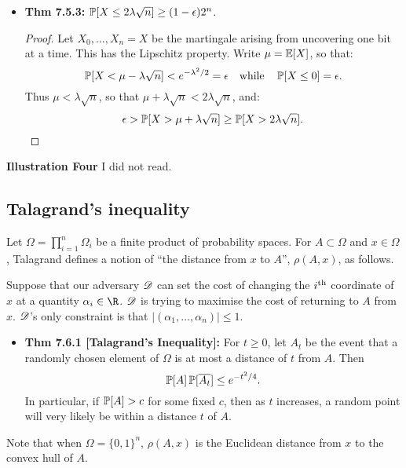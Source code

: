 \documentclass[11pt]{article}
\newenvironment{INT}[1][]{\begin{itemize}\small\item\textbf{#1}}{\end{itemize}}
\begin{document}
\begin{chapter7}
\begin{itemise}
\begin{INT}[Thm 7.5.3:]
$\operatorname{\mathbb{P}}[X\leq{2\lambda\sqrt n}]\geq(1-\epsilon)2^{n}$.
\begin{proof}
Let $X_0,\ldots,X_n=X$ be the martingale arising from uncovering one bit at a time.  This has the Lipschitz property. Write $\mu=\operatorname{\mathbb{E}}[X]$, so that: 
\[\operatorname{\mathbb{P}}[X<\mu-\lambda\sqrt n]<e^{-\lambda^2/2}=\epsilon\textup{\quad while\quad }\operatorname{\mathbb{P}}[X\leq0]=\epsilon.\]
Thus $\mu<\lambda\sqrt n$, so that $\mu+\lambda\sqrt n<2\lambda\sqrt n$, and:
\[\epsilon>\operatorname{\mathbb{P}}[X>\mu+\lambda\sqrt n]\geq\operatorname{\mathbb{P}}[X>2\lambda\sqrt n].\qedhere\]
\end{proof}
\end{INT}
\item \textbf{Illustration Four} I did not read.
\end{itemise}
\subsection*{Talagrand's inequality}
Let $\Omega=\prod_{i=1}^n\Omega_i$ be a finite product of probability spaces. For $A\subset\Omega$ and $x\in \Omega$, Talagrand defines a notion of ``the distance from $x$ to $A$'', $\rho(A,x)$, as follows.

\INDENT Suppose that our adversary $\mathscr{D}$ can set the cost of changing the $i^\textup{th}$ coordinate of $x$ at a quantity $\alpha_i\in\R$. $\mathscr{D}$ is trying to maximise the cost of returning to $A$ from $x$. $\mathscr{D}$'s only constraint is that $|(\alpha_1,\ldots,\alpha_n)|\leq1$.
\begin{INT}[Thm 7.6.1 {[Talagrand's Inequality]}:] For $t\geq0$, let $A_t$ be the event that a randomly chosen element of $\Omega$ is at most a distance of $t$ from $A$. Then
\[\operatorname{\mathbb{P}}[A]\operatorname{\mathbb{P}}[\overline{A_t}]\leq e^{-t^2/4}.\]
In particular, if $\operatorname{\mathbb{P}}[A]>c$ for some fixed $c$, then as $t$ increases, a random point will very likely be within a distance $t$ of $A$.
\end{INT}
Note that when $\Omega=\{0,1\}^n$, $\rho(A,x)$ is the Euclidean distance from $x$ to the convex hull of $A$.

\end{chapter7}
\end{document}
